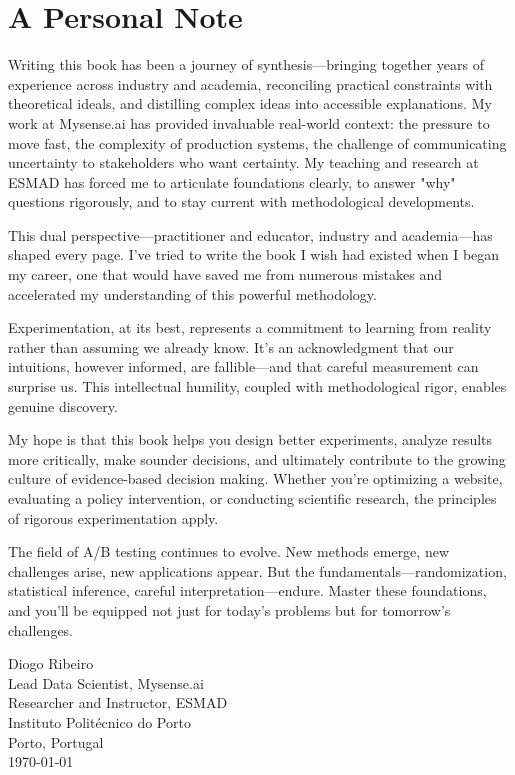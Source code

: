 \section*{A Personal Note}

Writing this book has been a journey of synthesis—bringing together years of experience across industry and academia, reconciling practical constraints with theoretical ideals, and distilling complex ideas into accessible explanations. My work at Mysense.ai has provided invaluable real-world context: the pressure to move fast, the complexity of production systems, the challenge of communicating uncertainty to stakeholders who want certainty. My teaching and research at ESMAD has forced me to articulate foundations clearly, to answer "why" questions rigorously, and to stay current with methodological developments.

This dual perspective—practitioner and educator, industry and academia—has shaped every page. I've tried to write the book I wish had existed when I began my career, one that would have saved me from numerous mistakes and accelerated my understanding of this powerful methodology.

Experimentation, at its best, represents a commitment to learning from reality rather than assuming we already know. It's an acknowledgment that our intuitions, however informed, are fallible—and that careful measurement can surprise us. This intellectual humility, coupled with methodological rigor, enables genuine discovery.

My hope is that this book helps you design better experiments, analyze results more critically, make sounder decisions, and ultimately contribute to the growing culture of evidence-based decision making. Whether you're optimizing a website, evaluating a policy intervention, or conducting scientific research, the principles of rigorous experimentation apply.

The field of A/B testing continues to evolve. New methods emerge, new challenges arise, new applications appear. But the fundamentals—randomization, statistical inference, careful interpretation—endure. Master these foundations, and you'll be equipped not just for today's problems but for tomorrow's challenges.

\vspace{1cm}

\begin{flushright}
Diogo Ribeiro\\
Lead Data Scientist, Mysense.ai\\
Researcher and Instructor, ESMAD\\
Instituto Politécnico do Porto\\
Porto, Portugal\\
\today
\end{flushright}
